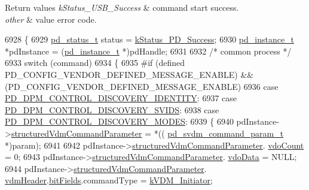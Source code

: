 \begin{DoxyRetVals}{Return values}
{\em k\-Status\-\_\-\-U\-S\-B\-\_\-\-Success} & command start success. \\
\hline
{\em other} & value error code. \\
\hline
\end{DoxyRetVals}

\begin{DoxyCode}
6928 \{
6929     \hyperlink{group__usb__pd__stack_ga04a1f331d9807a70ab9bb753f5ed1c80}{pd\_status\_t} status = \hyperlink{group__usb__pd__stack_ggaaad4cd00dd02567c6169429e3a895073acf06f954f9c52f560cea34df48c63555}{kStatus\_PD\_Success};
6930     \hyperlink{struct__pd__instance}{pd\_instance\_t} *pdInstance = (\hyperlink{struct__pd__instance}{pd\_instance\_t} *)pdHandle;
6931 
6932     \textcolor{comment}{/* common process */}
6933     \textcolor{keywordflow}{switch} (command)
6934     \{
6935 \textcolor{preprocessor}{#if (defined PD\_CONFIG\_VENDOR\_DEFINED\_MESSAGE\_ENABLE) && (PD\_CONFIG\_VENDOR\_DEFINED\_MESSAGE\_ENABLE)
}
6936 \textcolor{preprocessor}{}        \textcolor{keywordflow}{case} \hyperlink{group__usb__pd__stack_ggabf2676c3360b7c572954ae09c0a5e46aa9db050ca92168863b9d0d02111a62d1f}{PD\_DPM\_CONTROL\_DISCOVERY\_IDENTITY}:
6937         \textcolor{keywordflow}{case} \hyperlink{group__usb__pd__stack_ggabf2676c3360b7c572954ae09c0a5e46aaee8cd08286d5286bdf2284f9af10e3ad}{PD\_DPM\_CONTROL\_DISCOVERY\_SVIDS}:
6938         \textcolor{keywordflow}{case} \hyperlink{group__usb__pd__stack_ggabf2676c3360b7c572954ae09c0a5e46aaf975cd0b8e1039525d282a872236eb96}{PD\_DPM\_CONTROL\_DISCOVERY\_MODES}:
6939         \{
6940             pdInstance->\hyperlink{struct__pd__instance_a37746abee0ebb0169f8a1e7227d8645b}{structuredVdmCommandParameter} = *((
      \hyperlink{struct__pd__svdm__param}{pd\_svdm\_command\_param\_t} *)param);
6941 
6942             pdInstance->\hyperlink{struct__pd__instance_a37746abee0ebb0169f8a1e7227d8645b}{structuredVdmCommandParameter}.
      \hyperlink{struct__pd__svdm__param_a153be4aa8e8fa9e41ac83eb41e513060}{vdoCount} = 0;
6943             pdInstance->\hyperlink{struct__pd__instance_a37746abee0ebb0169f8a1e7227d8645b}{structuredVdmCommandParameter}.
      \hyperlink{struct__pd__svdm__param_a1da6696ea0b07e0173cc469094639e99}{vdoData} = NULL;
6944             pdInstance->\hyperlink{struct__pd__instance_a37746abee0ebb0169f8a1e7227d8645b}{structuredVdmCommandParameter}.
      \hyperlink{struct__pd__svdm__param_aaebc50d834d15e862f264a4e4d8421b4}{vdmHeader}.\hyperlink{struct__pd__structured__vdm__header_afc8471a70fa430820836286de3cf2281}{bitFields}.commandType = \hyperlink{group__usb__pd__stack_ggaa6b2f8f6620280d0d17ab102c5992ca8a0081a7547bb0feb88cd34c46cc1e9146}{kVDM\_Initiator};

\end{DoxyCode}
